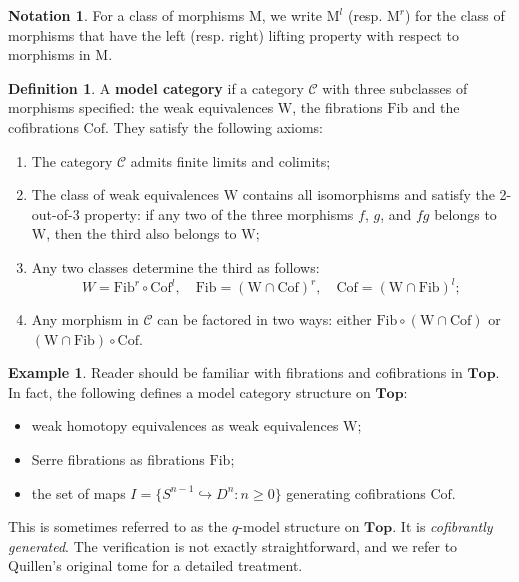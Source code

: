 \documentclass[psamsfonts]{amsart}
\theoremstyle{definition}
\newtheorem{defn}{Definition}[section]
\newtheorem{exmp}{Example}[section]
\newtheorem{notn}{Notation}[section]
\newcommand{\Top}{\mathbf{Top}}
\newcommand{\W}{\mathrm{W}}
\newcommand{\Fib}{\mathrm{Fib}}
\newcommand{\Cof}{\mathrm{Cof}}
\numberwithin{equation}{section}
\begin{document}
\begin{notn}
For a class of morphisms $\mathrm{M}$, we write $\mathrm{M}^l$ (resp. $\mathrm{M}^r$) for the class of morphisms that have the left (resp. right) lifting property with respect to morphisms in $\mathrm{M}$.
\end{notn}

\begin{defn}
A \textbf{model category} if a category $\mathcal{C}$ with three subclasses of morphisms specified: the weak equivalences $\W$, the fibrations $\Fib$ and the cofibrations $\Cof$. They satisfy the following axioms:\begin{enumerate}[(M1)]
    \item The category $\mathcal{C}$ admits finite limits and colimits;
    \item The class of weak equivalences $\W$ contains all isomorphisms and satisfy the 2-out-of-3 property: if any two of the three morphisms $f$, $g$, and $fg$ belongs to $\W$, then the third also belongs to $\W$;
    \item Any two classes determine the third as follows:
    \[W=\Fib^r\circ\Cof^l,\quad\Fib=(\W\cap\Cof)^r,\quad\Cof=(\W\cap\Fib)^l;\]
    \item Any morphism in $\mathcal{C}$ can be factored in two ways: either $\Fib\circ(\W\cap\Cof)$ or $(\W\cap\Fib)\circ\Cof$.
\end{enumerate}
\end{defn}

\begin{exmp}
Reader should be familiar with fibrations and cofibrations in $\Top$. In fact, the following defines a model category structure on $\Top$:\begin{itemize}
    \item weak homotopy equivalences as weak equivalences $\W$;
    \item Serre fibrations as fibrations $\Fib$;
    \item the set of maps $I=\{S^{n-1}\hookrightarrow D^n:n\geq0\}$ generating cofibrations $\Cof$.
\end{itemize}
This is sometimes referred to as the $q$-model structure on $\Top$. It is \textit{cofibrantly generated}. The verification is not exactly straightforward, and we refer to Quillen's original tome \cite{Quillen} for a detailed treatment.
\end{exmp}
\end{document}
